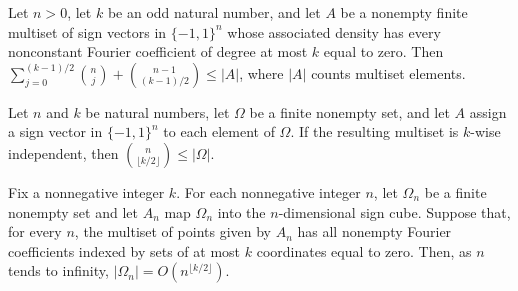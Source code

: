 \begin{theorem}
\label{FABL.odd_kWiseIndependentMultiset_card_lowerBound}
\leanok
{}
Let $n>0$, let $k$ be an odd natural number, and let $A$ be a nonempty finite multiset
of sign vectors in $\{-1,1\}^n$ whose associated density has every nonconstant Fourier
coefficient of degree at most $k$ equal to zero. Then $\displaystyle
\sum_{j=0}^{(k-1)/2}\binom{n}{j}+\binom{n-1}{(k-1)/2}\le |A|$, where $|A|$ counts
multiset elements.
\end{theorem}

\begin{theorem}
\label{FABL.choose_floor_half_le_card_of_isKWiseIndependentMultiset}
\leanok
{}
Let $n$ and $k$ be natural numbers, let $\Omega$ be a finite nonempty set, and let $A$
assign a sign vector in $\{-1,1\}^{n}$ to each element of $\Omega$. If the resulting
multiset is $k$-wise independent, then $\binom{n}{\lfloor k/2\rfloor}\leq |\Omega|$.
\end{theorem}

\begin{theorem}
\label{FABL.kWiseIndependentMultiset_card_isOmega}
\leanok
{}
Fix a nonnegative integer $k$. For each nonnegative integer $n$, let $\Omega_n$ be a
finite nonempty set and let $A_n$ map $\Omega_n$ into the $n$-dimensional sign cube.
Suppose that, for every $n$, the multiset of points given by $A_n$ has all nonempty
Fourier coefficients indexed by sets of at most $k$ coordinates equal to zero. Then, as
$n$ tends to infinity, $|\Omega_n|=O\!\left(n^{\lfloor k/2\rfloor}\right)$.
\end{theorem}
